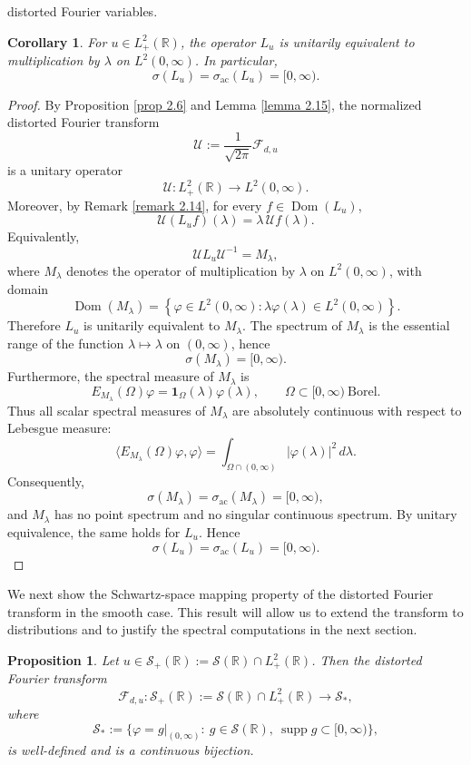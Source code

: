 \documentclass[10pt]{article}
\newtheorem{proposition}[theorem]{Proposition}
\newtheorem{corollary}[theorem]{Corollary}
\numberwithin{equation}{section}
\numberwithin{theorem}{section}
\begin{document}
distorted Fourier variables.
\begin{corollary}
\label{coro 2.14}
For $u \in L_{+}^{2}(\mathbb R)$, the operator \(L_u\) is unitarily equivalent to multiplication by \(\lambda\) on
\(L^2(0,\infty)\). In particular,
\[
\sigma(L_u)=\sigma_{\mathrm{ac}}(L_u)=[0,\infty).
\]
\end{corollary}
\begin{proof}
By Proposition \ref{prop 2.6} and Lemma \ref{lemma 2.15}, the normalized distorted Fourier transform
\[
\mathcal U:=\frac{1}{\sqrt{2\pi}}\mathcal{F}_{d,u}
\]
is a unitary operator
\[
\mathcal U:L^2_+(\mathbb R)\longrightarrow L^2(0,\infty).
\]
Moreover, by Remark \ref{remark 2.14}, for every \(f\in \operatorname{Dom}(L_u)\),
\[
\mathcal U(L_uf)(\lambda)=\lambda\,\mathcal U f(\lambda).
\]
Equivalently,
\[
\mathcal U L_u\mathcal U^{-1}=M_\lambda,
\]
where \(M_\lambda\) denotes the operator of multiplication by \(\lambda\) on
\(L^2(0,\infty)\), with domain
\[
\operatorname{Dom}(M_\lambda)
=
\left\{
\varphi\in L^2(0,\infty):\lambda\varphi(\lambda)\in L^2(0,\infty)
\right\}.
\]
Therefore \(L_u\) is unitarily equivalent to \(M_\lambda\). The spectrum of
\(M_\lambda\) is the essential range of the function \(\lambda\mapsto\lambda\) on
\((0,\infty)\), hence
\[
\sigma(M_\lambda)=[0,\infty).
\]
Furthermore, the spectral measure of \(M_\lambda\) is
\[
E_{M_\lambda}(\Omega)\varphi
=
\mathbf 1_\Omega(\lambda)\varphi(\lambda),
\qquad
\Omega\subset[0,\infty)\ \text{Borel}.
\]
Thus all scalar spectral measures of \(M_\lambda\) are absolutely continuous with respect
to Lebesgue measure:
\[
\langle E_{M_\lambda}(\Omega)\varphi,\varphi\rangle
=
\int_{\Omega\cap(0,\infty)}|\varphi(\lambda)|^2\,d\lambda.
\]
Consequently,
\[
\sigma(M_\lambda)=\sigma_{\mathrm{ac}}(M_\lambda)=[0,\infty),
\]
and \(M_\lambda\) has no point spectrum and no singular continuous spectrum. By unitary
equivalence, the same holds for \(L_u\). Hence
\[
\sigma(L_u)=\sigma_{\mathrm{ac}}(L_u)=[0,\infty).
\]
\end{proof}

\noindent
We next show the Schwartz-space mapping property of the distorted Fourier transform in
the smooth case. This result will allow us to extend the transform to distributions and
to justify the spectral computations in the next section.
\begin{proposition}
\label{proposition 3.6}
Let \(u\in \mathcal{S}_{+}(\mathbb R):=\mathcal{S}(\mathbb R)\cap L^2_+(\mathbb R)\). Then the distorted Fourier transform
\[
\mathcal{F}_{d,u}:\mathcal{S}_{+}(\mathbb R):=\mathcal{S}(\mathbb R)\cap L^2_+(\mathbb R)\longrightarrow
\mathcal{S}_{*},
\]
where
\[
\mathcal{S}_{*}:=\{\varphi=g|_{(0,\infty)}:\ g\in \mathcal{S}(\mathbb R),\
\operatorname{supp}g\subset[0,\infty)\},
\]
is well-defined and is a continuous bijection.
\end{proposition}
\end{document}
